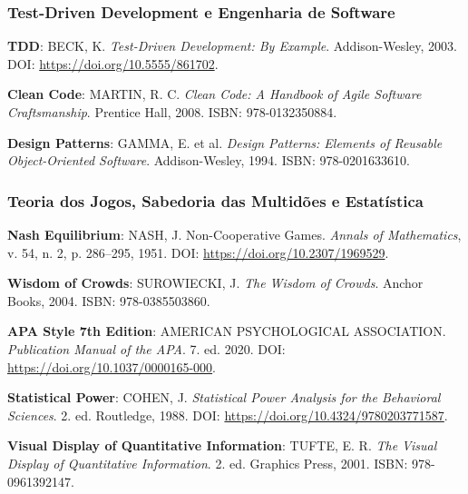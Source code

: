 \subsubsection{Test-Driven Development e Engenharia de Software}

\begin{enumerate}[leftmargin=*, label={[R\arabic*]}, resume]
  \item \textbf{TDD}: BECK, K. \textit{Test-Driven Development: By Example}. Addison-Wesley, 2003. DOI: \url{https://doi.org/10.5555/861702}.
  
  \item \textbf{Clean Code}: MARTIN, R. C. \textit{Clean Code: A Handbook of Agile Software Craftsmanship}. Prentice Hall, 2008. ISBN: 978-0132350884.
  
  \item \textbf{Design Patterns}: GAMMA, E. et al. \textit{Design Patterns: Elements of Reusable Object-Oriented Software}. Addison-Wesley, 1994. ISBN: 978-0201633610.
\end{enumerate}

\subsubsection{Teoria dos Jogos, Sabedoria das Multidões e Estatística}

\begin{enumerate}[leftmargin=*, label={[R\arabic*]}, resume]
  \item \textbf{Nash Equilibrium}: NASH, J. Non-Cooperative Games. \textit{Annals of Mathematics}, v. 54, n. 2, p. 286--295, 1951. DOI: \url{https://doi.org/10.2307/1969529}.
  
  \item \textbf{Wisdom of Crowds}: SUROWIECKI, J. \textit{The Wisdom of Crowds}. Anchor Books, 2004. ISBN: 978-0385503860.
  
  \item \textbf{APA Style 7th Edition}: AMERICAN PSYCHOLOGICAL ASSOCIATION. \textit{Publication Manual of the APA}. 7. ed. 2020. DOI: \url{https://doi.org/10.1037/0000165-000}.
  
  \item \textbf{Statistical Power}: COHEN, J. \textit{Statistical Power Analysis for the Behavioral Sciences}. 2. ed. Routledge, 1988. DOI: \url{https://doi.org/10.4324/9780203771587}.
  
  \item \textbf{Visual Display of Quantitative Information}: TUFTE, E. R. \textit{The Visual Display of Quantitative Information}. 2. ed. Graphics Press, 2001. ISBN: 978-0961392147.
\end{enumerate}

